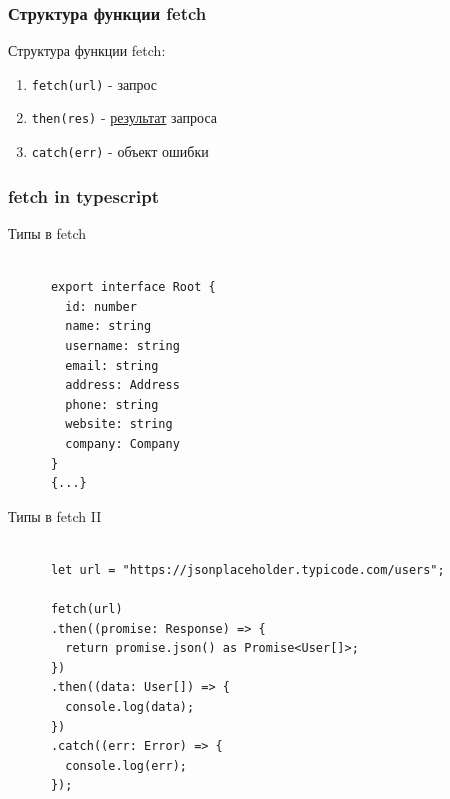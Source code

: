 \documentclass[aspectratio=169]{beamer}
\begin{document}

\begin{frame}[fragile]
  \frametitle{Структура функции fetch}
  \begin{center}
    Структура функции fetch:
  \end{center}
  \begin{enumerate}
  \item \texttt{fetch(url)} - запрос
  \item \texttt{then(res)} - \underline{результат} запроса
  \item \texttt{catch(err)} - объект ошибки
  \end{enumerate}
\end{frame}


\begin{frame}
  \frametitle{fetch in typescript}
  \begin{block}{Типы в fetch}
    \begin{verbatim}

      export interface Root {
        id: number
        name: string
        username: string
        email: string
        address: Address
        phone: string
        website: string
        company: Company
      }
      {...}
    \end{verbatim}
  \end{block}

  \begin{block}{Типы в fetch II}
    \begin{verbatim}

      let url = "https://jsonplaceholder.typicode.com/users";

      fetch(url)
      .then((promise: Response) => {
        return promise.json() as Promise<User[]>;
      })
      .then((data: User[]) => {
        console.log(data);
      })
      .catch((err: Error) => {
        console.log(err);
      });

    \end{verbatim}
    \end{block}
  
\end{frame}
\end{document}
